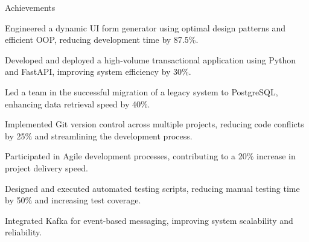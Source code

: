 \documentclass{resume} %
\begin{document}
    \begin{rSection}{Achievements}
        \begin{rSubsection}{}{}{}
                            \item Engineered a dynamic UI form generator using optimal design patterns and efficient OOP, reducing development time by 87.5\%.
                            \item Developed and deployed a high{-}volume transactional application using Python and FastAPI, improving system efficiency by 30\%.
                            \item Led a team in the successful migration of a legacy system to PostgreSQL, enhancing data retrieval speed by 40\%.
                            \item Implemented Git version control across multiple projects, reducing code conflicts by 25\% and streamlining the development process.
                            \item Participated in Agile development processes, contributing to a 20\% increase in project delivery speed.
                            \item Designed and executed automated testing scripts, reducing manual testing time by 50\% and increasing test coverage.
                            \item Integrated Kafka for event{-}based messaging, improving system scalability and reliability.
                    \end{rSubsection}
    \end{rSection}
\end{document}
